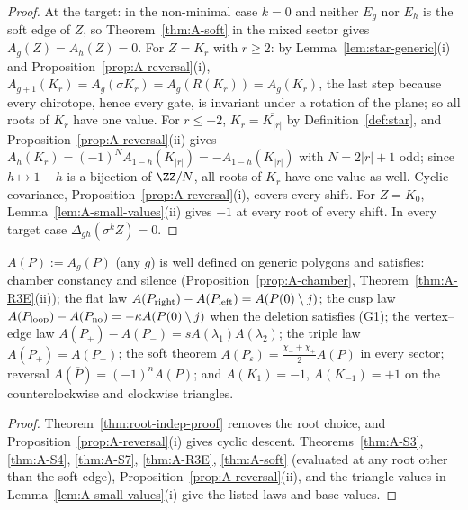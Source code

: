 \begin{proof}
At the target: in the non-minimal case $k=0$ and neither $E_g$ nor $E_h$ is
the soft edge of $Z$, so Theorem~\ref{thm:A-soft} in the mixed sector gives
$A_g(Z)=A_h(Z)=0$. For $Z=K_r$ with $r\geq2$: by Lemma~\ref{lem:star-generic}(i) and
Proposition~\ref{prop:A-reversal}(i),
$A_{g+1}(K_r)=A_g(\sigma K_r)=A_g(R(K_r))=A_g(K_r)$, the last step because
every chirotope, hence every gate, is invariant under a rotation of the plane;
so all roots of $K_r$ have one value. For $r\leq-2$, $K_r=\overline{K_{|r|}}$
by Definition~\ref{def:star}, and Proposition~\ref{prop:A-reversal}(ii) gives
$A_h(K_r)=(-1)^NA_{1-h}(K_{|r|})=-A_{1-h}(K_{|r|})$ with $N=2|r|+1$ odd; since
$h\mapsto1-h$ is a bijection of $\ZZ/N$, all roots of $K_r$ have one value as
well. Cyclic covariance, Proposition~\ref{prop:A-reversal}(i), covers every
shift. For $Z=K_0$, Lemma~\ref{lem:A-small-values}(ii) gives $-1$ at every
root of every shift. In every target case $\Delta_{gh}(\sigma^kZ)=0$.
\end{proof}

\begin{corollary}\label{cor:A-lawful}\leanok
$A(P):=A_g(P)$ (any $g$) is well defined on generic polygons and satisfies:
chamber constancy and silence (Proposition~\ref{prop:A-chamber},
Theorem~\ref{thm:A-R3E}(ii)); the flat law
$A(P_{\rm right})-A(P_{\rm left})=A(P(0)\setminus j)$; the cusp law
$A(P_{\rm loop})-A(P_{\rm no})=-\kappa A(P(0)\setminus j)$ when the deletion
satisfies (G1); the vertex--edge law $A(P_+)-A(P_-)=sA(\lambda_1)A(\lambda_2)$;
the triple law $A(P_+)=A(P_-)$; the soft theorem
$A(P_\varepsilon)=\frac{\chi_-+\chi_+}2A(P)$ in every sector; reversal
$A(\overline P)=(-1)^nA(P)$; and $A(K_1)=-1$, $A(K_{-1})=+1$ on the
counterclockwise and clockwise triangles. 
\end{corollary}
\begin{proof}\leanok{}
Theorem~\ref{thm:root-indep-proof} removes the root choice, and
Proposition~\ref{prop:A-reversal}(i) gives cyclic descent.
Theorems~\ref{thm:A-S3}, \ref{thm:A-S4}, \ref{thm:A-S7}, \ref{thm:A-R3E},
\ref{thm:A-soft} (evaluated at any root other than the soft edge),
Proposition~\ref{prop:A-reversal}(ii), and the triangle values in
Lemma~\ref{lem:A-small-values}(i) give the listed laws and base values.
\end{proof}


